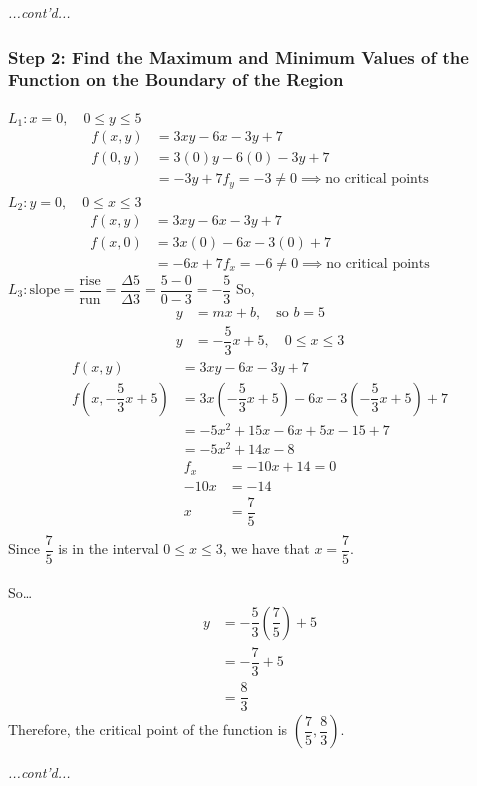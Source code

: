 \documentclass{article}
\begin{document}
\begin{examplebox}
    \begin{solutionbox}
        \textit{...cont'd...}
        \subsubsection*{Step 2: Find the Maximum and Minimum Values of the Function on the Boundary of the Region}
        \( L_1: x = 0, \quad 0 \leq y \leq 5 \)
        \begin{align*}
            f(x, y) &= 3xy - 6x - 3y + 7 \\
            f(0, y) &= 3(0)y - 6(0) - 3y + 7 \\
            &= -3y + 7
            f_y = -3 \neq 0 \implies \text{no critical points}
        \end{align*}
        \( L_2: y = 0, \quad 0 \leq x \leq 3 \)
        \begin{align*}
            f(x, y) &= 3xy - 6x - 3y + 7 \\
            f(x, 0) &= 3x(0) - 6x - 3(0) + 7 \\
            &= -6x + 7
            f_x = -6 \neq 0 \implies \text{no critical points}
        \end{align*}
        \( L_3: \text{slope} = \dfrac{\text{rise}}{\text{run}} = \dfrac{\Delta 5}{\Delta 3} = \dfrac{5 - 0}{0 - 3} = -\dfrac{5}{3} \)
        So,
        \begin{align*}
            y &= mx + b, \quad \text{so } b = 5 \\
            y &= -\dfrac{5}{3}x + 5, \quad 0 \leq x \leq 3
        \end{align*}
        \begin{align*}
            f(x, y) &= 3xy - 6x - 3y + 7 \\
            f(x, -\dfrac{5}{3}x + 5) &= 3x(-\dfrac{5}{3}x + 5) - 6x - 3(-\dfrac{5}{3}x + 5) + 7 \\
            &= -5x^2 + 15x - 6x + 5x - 15 + 7 \\
            &= -5x^2 + 14x - 8
        \end{align*}
        \begin{align*}
            f_x &= -10x + 14 = 0 \\
            -10x &= -14 \\
            x &= \dfrac{7}{5} \\
        \end{align*}
        Since \( \dfrac{7}{5} \) is in the interval \( 0 \leq x \leq 3 \), we have that \( x = \dfrac{7}{5} \). \\
        \\
        So\dots
        \begin{align*}
            y &= -\dfrac{5}{3}(\dfrac{7}{5}) + 5 \\
            &= -\dfrac{7}{3} + 5 \\
            &= \dfrac{8}{3}
        \end{align*}
        Therefore, the critical point of the function is \( (\dfrac{7}{5}, \dfrac{8}{3}) \).
    \end{solutionbox}
    \textit{...cont'd...}
\end{examplebox}
\end{document}
